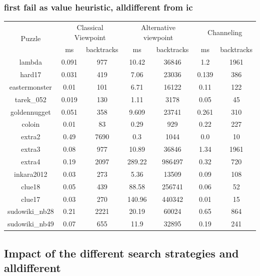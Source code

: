 \documentclass{report}
\begin{document}
\subsubsection{first fail as value heuristic, alldifferent from ic}
\begin{table}[h!]
  \begin{tabular}{|c|c|c|c|c|c|c|}
    \hline
    \multirow{2}{*}{Puzzle} &
    \multicolumn{2}{L|}{Classical Viewpoint} &
    \multicolumn{2}{L|}{Alternative viewpoint} &
    \multicolumn{2}{L|}{Channeling} \\
    & ms & backtracks & ms & backtracks & ms & backtracks \\
    \hline
        lambda & 0.091 & 977 & 10.42 & 36846 & 1.2 & 1961 \\
        hard17 & 0.031 & 419 & 7.06 & 23036 & 0.139 & 386 \\
        eastermonster & 0.01 & 101 & 6.71 & 16122 & 0.11 & 122 \\
        tarek\_052 & 0.019 & 130 & 1.11 & 3178 & 0.05 & 45 \\
        goldennugget & 0.051 & 358 & 9.609 & 23741 & 0.261 & 310 \\
        coloin & 0.01 & 83 & 0.29 & 929 & 0.22 & 227 \\
        extra2 & 0.49 & 7690 & 0.3 & 1044 & 0.0 & 10 \\
        extra3 & 0.08 & 977 & 10.89 & 36846 & 1.34 & 1961 \\
        extra4 & 0.19 & 2097 & 289.22 & 986497 & 0.32 & 720 \\
        inkara2012 & 0.03 & 273 & 5.36 & 13509 & 0.09 & 108 \\
        clue18 & 0.05 & 439 & 88.58 & 256741 & 0.06 & 52 \\
        clue17 & 0.03 & 270 & 140.96 & 440342 & 0.01 & 15 \\
        sudowiki\_nb28 & 0.21 & 2221 & 20.19 & 60024 & 0.65 & 864 \\
        sudowiki\_nb49 & 0.07 & 655 & 11.9 & 32895 & 0.19 & 241 \\
    \hline
  \end{tabular}
\end{table}
\newpage
\subsection{Impact of the different search strategies and alldifferent}
\end{document}

